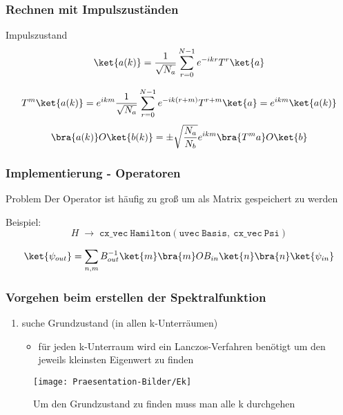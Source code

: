 \documentclass{beamer}
\begin{document}
\begin{frame}
\frametitle{Rechnen mit Impulszuständen}
\begin{block}{Impulszustand}
\[ \ket{a(k)} = \frac{1}{\sqrt{N_a}}\sum_{r=0}^{N-1}e^{-ikr}T^r\ket{a} \]
\end{block}
\[ T^m\ket{a(k)} = e^{ikm}\frac{1}{\sqrt{N_a}}\sum_{r=0}^{N-1}e^{-ik(r+m)}T^{r+m}\ket{a}=e^{ikm}\ket{a(k)} \]
\[ \bra{a(k)}O\ket{b(k)} = \pm\sqrt{\frac{N_a}{N_b}}e^{ikm} \bra{T^ma}O\ket{b} \]
\end{frame}

\begin{frame}
\frametitle{Implementierung - Operatoren}
\begin{block}{Problem}
Der Operator ist häufig zu groß um als Matrix gespeichert zu werden
\end{block}
Beispiel:
\[ H\;\rightarrow\; \mathtt{cx\_vec\: Hamilton(uvec\: Basis,\:cx\_vec\: Psi)}\]


\[ \ket{\psi_{out}} = \sum_{n,m}B^{-1}_{out}\ket{m}\bra{m}OB_{in}\ket{n}\bra{n}\ket{\psi_{in}} \]
\end{frame}

\begin{frame}
\frametitle{Vorgehen beim erstellen der Spektralfunktion}
\begin{enumerate}
	\item suche Grundzustand (in allen k-Unterräumen)
	\begin{itemize}
		\item für jeden k-Unterraum wird ein Lanczos-Verfahren benötigt um den jeweils kleinsten Eigenwert zu finden
	\end{itemize}
\end{enumerate}
\vbox{}\vbox{}\vbox{}\vbox{}\vbox{}\vbox{}\vbox{}\vbox{}\vbox{}\vbox{}\vbox{}\vbox{}
\end{frame}

\begin{frame}
	\begin{figure}
		\centering
		\texttt{[image: Praesentation-Bilder/Ek]}
		\caption{Um den Grundzustand zu finden muss man alle k durchgehen}
		\label{fig:ek}
	\end{figure}
	
\end{frame}
\end{document}
